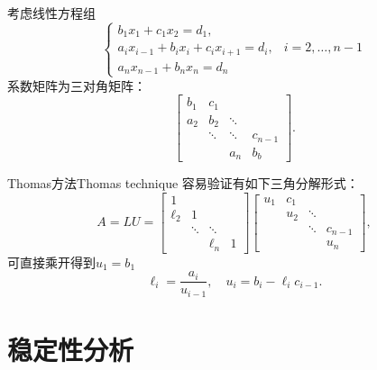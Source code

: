 考虑线性方程组
\[
    \begin{cases}
        b_1x_1+c_1x_2=d_1,\\
        a_ix_{i-1}+b_ix_i+c_ix_{i+1}=d_i,&i=2,\ldots,n-1\\
        a_nx_{n-1}+b_nx_n=d_n
    \end{cases}
\]
系数矩阵为三对角矩阵：
\[
    \begin{bmatrix}
        b_1&c_1\\a_2&b_2&\ddots\\ &\ddots&\ddots&c_{n-1}\\ &&a_n&b_b
    \end{bmatrix}.
\]
\begin{theorem}
    {Thomas方法}{Thomas technique}
    容易验证有如下三角分解形式：
    \[
        A=LU=\begin{bmatrix}
            1\\\ell_2&1\\&\ddots&\ddots\\ &&\ell_n&1
        \end{bmatrix}\begin{bmatrix}
            u_1&c_1\\ &u_2&\ddots\\ &&\ddots&c_{n-1}\\ &&&u_n
        \end{bmatrix},
    \]
    可直接乘开得到$u_1=b_1$
    \begin{equation}
        \ell_i=\frac{a_i}{u_{i-1}},\quad u_i=b_i-\ell_ic_{i-1}.
    \end{equation}
\end{theorem}


\section{稳定性分析}
\label{sec:stability analysis}

